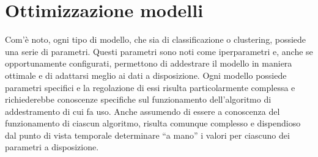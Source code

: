 \documentclass[12pt,oneside]{article}
\begin{document}
\section{Ottimizzazione modelli}\label{ott}
    \begin{justify}
        Com’è noto, ogni tipo di modello, che sia di classificazione o clustering, possiede una serie di parametri. Questi parametri sono noti come iperparametri e, anche se opportunamente configurati, permettono di addestrare il modello in maniera ottimale e di adattarsi meglio ai dati a disposizione. Ogni modello possiede parametri specifici e la regolazione di essi risulta particolarmente complessa e richiederebbe conoscenze specifiche sul funzionamento dell’algoritmo di addestramento di cui fa uso. Anche assumendo di essere a conoscenza del funzionamento di ciascun algoritmo, risulta comunque complesso e dispendioso dal punto di vista temporale determinare “a mano” i valori per ciascuno dei parametri a disposizione.
        \end{justify}
    \newpage
\end{document}
